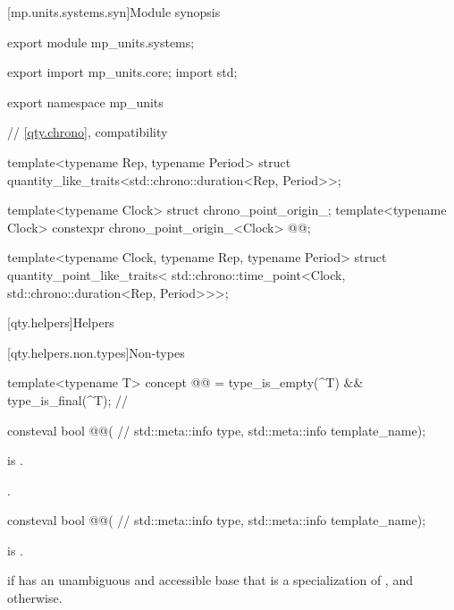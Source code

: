 [mp.units.systems.syn]{Module  synopsis}
%
\begin{codeblock}
export module mp_units.systems;

export import mp_units.core;
import std;

export namespace mp_units {

// \ref{qty.chrono},  compatibility

template<typename Rep, typename Period>
struct quantity_like_traits<std::chrono::duration<Rep, Period>>;

template<typename Clock>
struct chrono_point_origin_;
template<typename Clock>
constexpr chrono_point_origin_<Clock> @@{};

template<typename Clock, typename Rep, typename Period>
struct quantity_point_like_traits<
  std::chrono::time_point<Clock, std::chrono::duration<Rep, Period>>>;

}
\end{codeblock}

[qty.helpers]{Helpers}

[qty.helpers.non.types]{Non-types}

\begin{itemdecl}
template<typename T>
concept @@ = type_is_empty(^T) && type_is_final(^T);  // \expos
\end{itemdecl}

\begin{itemdecl}
consteval bool @@(  // \expos
  std::meta::info type, std::meta::info template_name);
\end{itemdecl}

\begin{itemdescr}
\pnum
\expects
{} is .

\pnum
\returns
{}.
\end{itemdescr}

\begin{itemdecl}
consteval bool @@(  // \expos
  std::meta::info type, std::meta::info template_name);
\end{itemdecl}

\begin{itemdescr}
\pnum
\expects
{} is .

\pnum
\returns
{} if
\tcode{[:type:]} has an unambiguous and accessible base
that is a specialization of , and
 otherwise.
\end{itemdescr}

